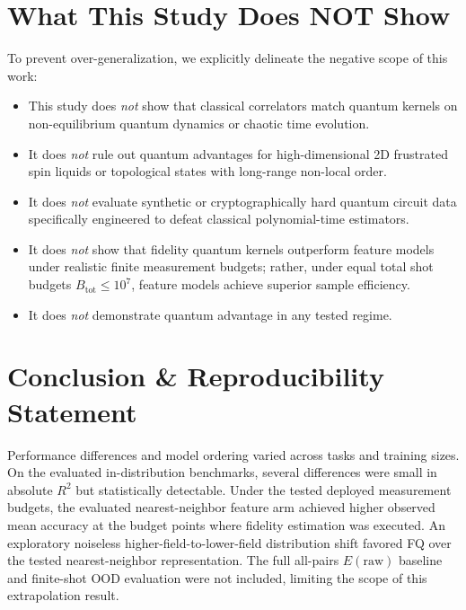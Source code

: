 \documentclass[conference]{IEEEtran}
\begin{document}
\section{What This Study Does NOT Show}
To prevent over-generalization, we explicitly delineate the negative scope of this work:
\begin{itemize}
    \item This study does \textit{not} show that classical correlators match quantum kernels on non-equilibrium quantum dynamics or chaotic time evolution.
    \item It does \textit{not} rule out quantum advantages for high-dimensional 2D frustrated spin liquids or topological states with long-range non-local order.
    \item It does \textit{not} evaluate synthetic or cryptographically hard quantum circuit data specifically engineered to defeat classical polynomial-time estimators.
    \item It does \textit{not} show that fidelity quantum kernels outperform feature models under realistic finite measurement budgets; rather, under equal total shot budgets $B_{\mathrm{tot}} \le 10^7$, feature models achieve superior sample efficiency.
    \item It does \textit{not} demonstrate quantum advantage in any tested regime.
\end{itemize}

\section{Conclusion \& Reproducibility Statement}
Performance differences and model ordering varied across tasks and training sizes. On the evaluated in-distribution benchmarks, several differences were small in absolute $R^2$ but statistically detectable. Under the tested deployed measurement budgets, the evaluated nearest-neighbor feature arm achieved higher observed mean accuracy at the budget points where fidelity estimation was executed. An exploratory noiseless higher-field-to-lower-field distribution shift favored FQ over the tested nearest-neighbor representation. The full all-pairs $E(\text{raw})$ baseline and finite-shot OOD evaluation were not included, limiting the scope of this extrapolation result.

\begingroup
\footnotesize


\endgroup
\end{document}
